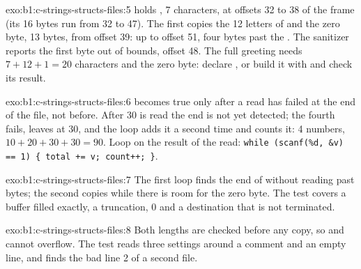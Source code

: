 \begin{solution}{exo:b1:c-strings-structs-files:5}
 holds , 7 characters, at offsets 32 to 38 of the frame (its 16 bytes run from 32 to
47). The first  copies the 12 letters of  and the zero byte, 13 bytes, from offset
39: up to offset 51, four bytes past the . The sanitizer reports the first byte out of bounds, offset 48. The full
greeting needs $7 + 12 + 1 = 20$ characters and the zero byte: declare , or build it with  and check its result.
\end{solution}

\begin{solution}{exo:b1:c-strings-structs-files:6}
 becomes true only after a read has failed at the end of the file, not before. After 30 is read the end is
not yet detected; the fourth  fails, leaves  at 30, and the loop adds it a second time and counts
it: 4 numbers, $10 + 20 + 30 + 30 = 90$. Loop on the result of the read: \texttt{while (scanf(\%d, \&v) == 1)
\{ total += v; count++; \}}.
\end{solution}

\begin{solution}{exo:b1:c-strings-structs-files:7}
The first loop finds the end of  without reading past  bytes; the second copies while there is room
for the zero byte. The test  covers a buffer filled exactly, a truncation,  0
and a destination that is not terminated.
\end{solution}

\begin{solution}{exo:b1:c-strings-structs-files:8}
Both lengths are checked before any copy, so  and  cannot overflow. The test
 reads three settings around a comment and an empty line, and finds the bad line 2 of a
second file.
\end{solution}


